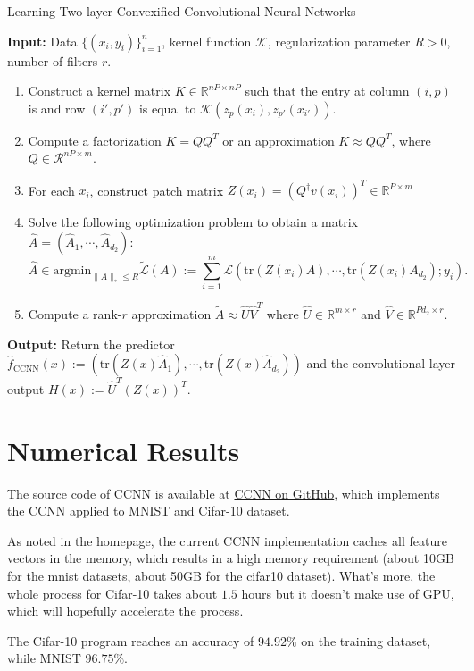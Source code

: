 \documentclass{article}
\renewcommand{\algorithmicrequire}{\textbf{Input:}}
\renewcommand{\algorithmicensure}{\textbf{Output:}}
\begin{document}
\begin{algorithm}
\caption{Learning Two-layer Convexified Convolutional Neural Networks}
\algorithmicrequire{ Data $\lbrace(x_i,y_i)\rbrace_{i=1}^n$, kernel function $\mathcal{K	}$, regularization parameter $R>0$, number of filters $r$.}
\begin{enumerate}
\item Construct a kernel matrix $K\in\mathbb{R}^{nP\times nP}$ such that the entry at column $(i,p)$ is and row $(i',p')$ is equal to $\mathcal{K}(z_p(x_i),z_{p'}(x_{i'}))$.
\item Compute a factorization $K=QQ^T$ or an approximation  $K\approx QQ^T$, where $Q\in\mathcal{R}^{nP\times m}$.
\item For each $x_i$, construct patch matrix $Z(x_i)=(Q^\dagger v(x_i))^T\in\mathbb{R}^{P\times m}$
\item Solve the following optimization problem to obtain a matrix $\widehat{A}=(\widehat{A}_1,\cdots,\widehat{A}_{d_2})$:
\[\widehat{A}\in\text{argmin}_{\|A\|_*\leq R}\tilde{\mathcal{L}}(A):=\sum_{i=1}^m\mathcal{L}(\text{tr}(Z(x_i)A),\cdots,\text{tr}(Z(x_i)A_{d_2});y_i).\]
\item Compute a rank-$r$ approximation $\tilde{A}\approx\widehat{U}\widehat{V}^T$ where $\widehat{U}\in\mathbb{R}^{m\times r}$ and $\widehat{V}\in\mathbb{R}^{Pd_2\times r}$.
\end{enumerate}
\algorithmicensure{ Return the predictor $\widehat{f}_{\text{CCNN}}(x):=(\text{tr}(Z(x)\widehat{A}_1),\cdots,\text{tr}(Z(x)\widehat{A}_{d_2}))$ and the convolutional layer output $H(x):=\widehat{U}^T(Z(x))^T$.}
\end{algorithm}
\section{Numerical Results}
The source code of CCNN is available at \href{https://github.com/zhangyuc/CCNN}{CCNN on GitHub}, which implements the CCNN applied to MNIST and Cifar-10 dataset. 

As noted in the homepage, the current CCNN implementation caches all feature vectors in the memory, which results in a high memory requirement (about 10GB for the mnist datasets, about 50GB for the cifar10 dataset). What's more, the whole process for Cifar-10 takes about $1.5$ hours but it doesn't make use of GPU, which will hopefully accelerate the process. 

The Cifar-10 program reaches an accuracy of $94.92\%$ on the training dataset, while MNIST $96.75\%$. 
\end{document}
